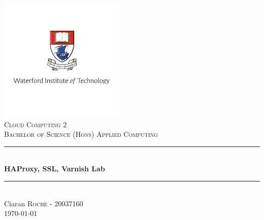 \begin{titlepage}

\newcommand{\HRule}{\rule{\linewidth}{0.5mm}}

\center

\includegraphics{images/logo.png}\\
\textsc{\Large Cloud Computing 2}\\[0.5cm]
\textsc{\large Bachelor of Science (Hons) Applied Computing }\\[0.5cm] 


\HRule \\[0.4cm]
{ \huge \bfseries HAProxy, SSL, Varnish Lab}\\[0.4cm] 
\HRule \\[1.5cm]

\Large Ciaran \textsc{Roche} - 20037160\\[3cm]


{\large \today}\\[1cm]

\vfill 

\end{titlepage}
